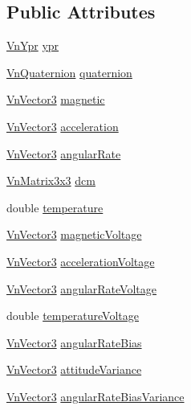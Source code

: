 \subsection*{Public Attributes}
\begin{DoxyCompactItemize}
\item 
\hyperlink{structVnYpr}{Vn\+Ypr} \hyperlink{structVn200CompositeData_a8f4e24b29eebf6c831bd0d70a10245cf}{ypr}
\item 
\hyperlink{structVnQuaternion}{Vn\+Quaternion} \hyperlink{structVn200CompositeData_ae8f8f1bb7562a36c339d0277c9482b9c}{quaternion}
\item 
\hyperlink{structVnVector3}{Vn\+Vector3} \hyperlink{structVn200CompositeData_adc0b6e40d7d534950a75d51f50ec41e7}{magnetic}
\item 
\hyperlink{structVnVector3}{Vn\+Vector3} \hyperlink{structVn200CompositeData_ada4e8832ecf9ad1647a3133bf7fb4923}{acceleration}
\item 
\hyperlink{structVnVector3}{Vn\+Vector3} \hyperlink{structVn200CompositeData_ad680afd12756b680b8363ed53514ea98}{angular\+Rate}
\item 
\hyperlink{structVnMatrix3x3}{Vn\+Matrix3x3} \hyperlink{structVn200CompositeData_a9394f78f541bcbc7cd16186199f34206}{dcm}
\item 
double \hyperlink{structVn200CompositeData_a3354f4053890e5c3edc22176b513ec02}{temperature}
\item 
\hyperlink{structVnVector3}{Vn\+Vector3} \hyperlink{structVn200CompositeData_aacc72f2786f804cd7cd6f90c18cbb6a1}{magnetic\+Voltage}
\item 
\hyperlink{structVnVector3}{Vn\+Vector3} \hyperlink{structVn200CompositeData_aae168546f0864e2d2d165b622152aa4e}{acceleration\+Voltage}
\item 
\hyperlink{structVnVector3}{Vn\+Vector3} \hyperlink{structVn200CompositeData_ac4333c88a47d68bbe686cc1e5a1b259f}{angular\+Rate\+Voltage}
\item 
double \hyperlink{structVn200CompositeData_a54ab3cb50923a9748d5550e4890627b7}{temperature\+Voltage}
\item 
\hyperlink{structVnVector3}{Vn\+Vector3} \hyperlink{structVn200CompositeData_a780c63b13f748a7833a715c25cdd27b6}{angular\+Rate\+Bias}
\item 
\hyperlink{structVnVector3}{Vn\+Vector3} \hyperlink{structVn200CompositeData_a1eb5997d5a09d80689fc5c96effcb078}{attitude\+Variance}
\item 
\hyperlink{structVnVector3}{Vn\+Vector3} \hyperlink{structVn200CompositeData_a9186314f8efaf045fce21acb7867a79d}{angular\+Rate\+Bias\+Variance}

\end{DoxyCompactItemize}
